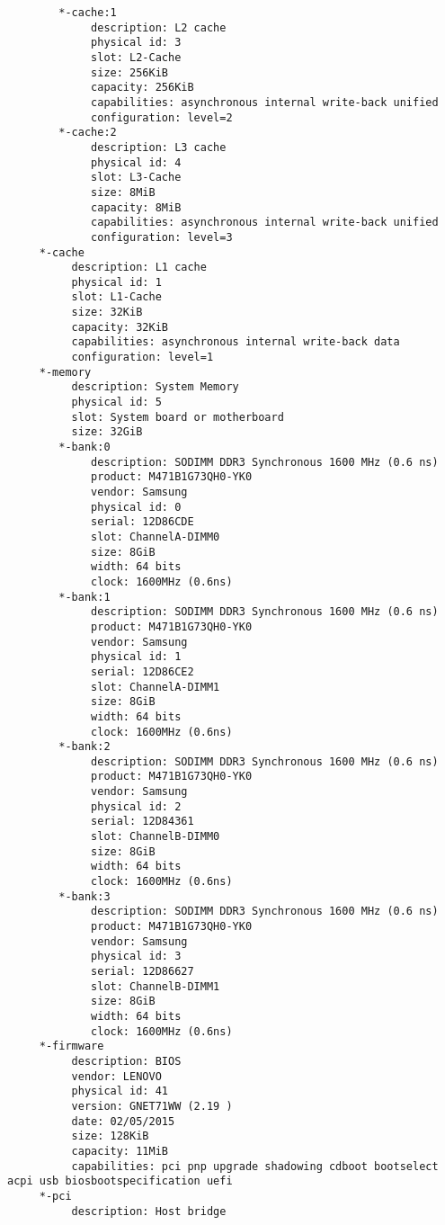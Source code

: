 \begin{verbatim}
        *-cache:1
             description: L2 cache
             physical id: 3
             slot: L2-Cache
             size: 256KiB
             capacity: 256KiB
             capabilities: asynchronous internal write-back unified
             configuration: level=2
        *-cache:2
             description: L3 cache
             physical id: 4
             slot: L3-Cache
             size: 8MiB
             capacity: 8MiB
             capabilities: asynchronous internal write-back unified
             configuration: level=3
     *-cache
          description: L1 cache
          physical id: 1
          slot: L1-Cache
          size: 32KiB
          capacity: 32KiB
          capabilities: asynchronous internal write-back data
          configuration: level=1
     *-memory
          description: System Memory
          physical id: 5
          slot: System board or motherboard
          size: 32GiB
        *-bank:0
             description: SODIMM DDR3 Synchronous 1600 MHz (0.6 ns)
             product: M471B1G73QH0-YK0
             vendor: Samsung
             physical id: 0
             serial: 12D86CDE
             slot: ChannelA-DIMM0
             size: 8GiB
             width: 64 bits
             clock: 1600MHz (0.6ns)
        *-bank:1
             description: SODIMM DDR3 Synchronous 1600 MHz (0.6 ns)
             product: M471B1G73QH0-YK0
             vendor: Samsung
             physical id: 1
             serial: 12D86CE2
             slot: ChannelA-DIMM1
             size: 8GiB
             width: 64 bits
             clock: 1600MHz (0.6ns)
        *-bank:2
             description: SODIMM DDR3 Synchronous 1600 MHz (0.6 ns)
             product: M471B1G73QH0-YK0
             vendor: Samsung
             physical id: 2
             serial: 12D84361
             slot: ChannelB-DIMM0
             size: 8GiB
             width: 64 bits
             clock: 1600MHz (0.6ns)
        *-bank:3
             description: SODIMM DDR3 Synchronous 1600 MHz (0.6 ns)
             product: M471B1G73QH0-YK0
             vendor: Samsung
             physical id: 3
             serial: 12D86627
             slot: ChannelB-DIMM1
             size: 8GiB
             width: 64 bits
             clock: 1600MHz (0.6ns)
     *-firmware
          description: BIOS
          vendor: LENOVO
          physical id: 41
          version: GNET71WW (2.19 )
          date: 02/05/2015
          size: 128KiB
          capacity: 11MiB
          capabilities: pci pnp upgrade shadowing cdboot bootselect acpi usb biosbootspecification uefi
     *-pci
          description: Host bridge

\end{verbatim}
